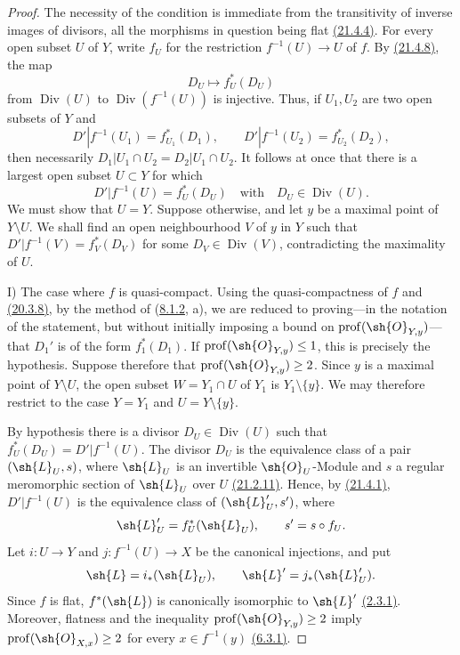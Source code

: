 \begin{proof}
The necessity of the condition is immediate from the transitivity of
inverse images of divisors, all the morphisms in question being flat
{\hyperlink{ega4.c04.statement.21-4-4}{(21.4.4)}}.  For every open subset $U$ of $Y$, write $f_U$ for the
restriction $f^{-1}(U)\to U$ of $f$.  By {\hyperlink{ega4.c04.prop.21-4-8}{(21.4.8)}}, the map
\[
 D_U\longmapsto f_U^*(D_U)
\]
from $\operatorname{Div}(U)$ to
$\operatorname{Div}(f^{-1}(U))$ is injective.  Thus, if $U_1,U_2$ are
two open subsets of $Y$ and
\[
 D'|f^{-1}(U_1)=f_{U_1}^*(D_1),\qquad
 D'|f^{-1}(U_2)=f_{U_2}^*(D_2),
\]
then necessarily
$D_1|U_1\cap U_2=D_2|U_1\cap U_2$.  It follows at once that there is a
largest open subset $U\subset Y$ for which
\[
 D'|f^{-1}(U)=f_U^*(D_U)
 \quad\text{with}\quad D_U\in\operatorname{Div}(U).
\]
We must show that $U=Y$.  Suppose otherwise, and let $y$ be a maximal
point of $Y\setminus U$.  We shall find an open neighbourhood $V$ of
$y$ in $Y$ such that
$D'|f^{-1}(V)=f_V^*(D_V)$ for some
$D_V\in\operatorname{Div}(V)$, contradicting the maximality of $U$.

\textup{I) The case where $f$ is quasi-compact.}
Using the quasi-compactness of $f$ and {\hyperlink{ega4.c04.prop.20-3-8}{(20.3.8)}}, by the method of
({\hyperlink{ega4.c04.statement.8-1-2}{8.1.2}}, a), we are reduced to proving---in the notation of the
statement, but without initially imposing a bound on
$\operatorname{prof}(\sh{O}_{Y,y})$---that $D_1'$ is of the form
$f_1^*(D_1)$.  If $\operatorname{prof}(\sh{O}_{Y,y})\leq 1$, this is
precisely the hypothesis.  Suppose therefore that
$\operatorname{prof}(\sh{O}_{Y,y})\geq 2$.  Since $y$ is a maximal
point of $Y\setminus U$, the open subset $W=Y_1\cap U$ of $Y_1$ is
$Y_1\setminus\{y\}$.  We may therefore restrict to the case
$Y=Y_1$ and $U=Y\setminus\{y\}$.

By hypothesis there is a divisor $D_U\in\operatorname{Div}(U)$ such
that $f_U^*(D_U)=D'|f^{-1}(U)$.  The divisor $D_U$ is the equivalence
class of a pair $(\sh{L}_U,s)$, where $\sh{L}_U$ is an invertible
$\sh{O}_U$-Module and $s$ a regular meromorphic section of $\sh{L}_U$
over $U$ {\hyperlink{ega4.c04.prop.21-2-11}{(21.2.11)}}.  Hence, by {\hyperlink{ega4.c04.statement.21-4-1}{(21.4.1)}}, $D'|f^{-1}(U)$ is the
equivalence class of $(\sh{L}'_U,s')$, where
\[
 \sh{L}'_U=f_U^*(\sh{L}_U),\qquad s'=s\circ f_U.
\]
Let $i:U\to Y$ and $j:f^{-1}(U)\to X$ be the canonical injections,
and put
\[
 \sh{L}=i_*(\sh{L}_U),\qquad
 \sh{L}'=j_*(\sh{L}'_U).
\]
Since $f$ is flat, $f^*(\sh{L})$ is canonically isomorphic to
$\sh{L}'$ {\hyperlink{ega4.c04.lem.2-3-1}{(2.3.1)}}.  Moreover, flatness and the inequality
$\operatorname{prof}(\sh{O}_{Y,y})\geq 2$ imply
$\operatorname{prof}(\sh{O}_{X,x})\geq 2$ for every
$x\in f^{-1}(y)$ {\hyperlink{ega4.c04.prop.6-3-1}{(6.3.1)}}.


\end{proof}
